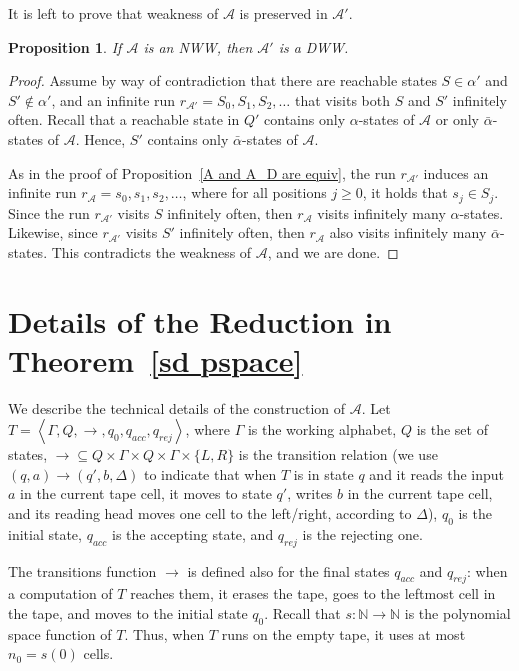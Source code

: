 \documentclass[10pt,a4paper]{amsart}
\newtheorem{prop}[thm]{Proposition}
\theoremstyle{definition}
\numberwithin{equation}{section}
\newcommand{\A}{{\mathcal A}}
\newcommand{\zug}[1]{\left\langle #1 \right\rangle}
\begin{document}
It is left to prove that weakness of $\A$ is preserved in $\A'$. 

\begin{prop}\label{NWW to DWW}
	If $\A$ is an NWW, then $\A'$ is a DWW.
\end{prop}

\begin{proof}
	Assume by way of contradiction that there are reachable states $S\in \alpha'$ and $S'\notin \alpha'$, and an infinite run $r_{\A'} = S_0, S_1, S_2, \ldots$ that visits both $S$ and $S'$ infinitely often. 
	Recall that a reachable state in $Q'$ contains only $\alpha$-states of $\A$ or only $\bar{\alpha}$-states of $\A$. Hence, $S'$ contains only $\bar{\alpha}$-states of $\A$. 
	
	As in the proof of Proposition~\ref{A and A_D are equiv}, the run $r_{\A'}$ induces an infinite run $r_\A = s_0, s_1, s_2, \ldots $, where for all positions $j \geq 0$, it holds that $s_j\in S_j$. Since the run $r_{\A'}$ visits $S$ infinitely often, then $r_\A$ visits infinitely many $\alpha$-states. Likewise, since $r_{\A'}$ visits  $S'$ infinitely often, then $r_\A$ also visits infinitely many $\bar{\alpha}$-states. This contradicts the weakness of $\A$, and we are done.
\end{proof}


\section{Details of the Reduction in Theorem~\ref{sd pspace}}
\label{app tm}


We describe the technical details of the construction of $\A$.
Let $T=\zug{\Gamma,Q,\rightarrow,q_0,q_{acc},q_{rej}}$, where $\Gamma$ is the working
alphabet, $Q$ is the set of states, $\rightarrow \subseteq Q \times
\Gamma \times Q \times \Gamma \times \{L,R\}$ is the transition
relation (we use $(q,a) \rightarrow (q',b,\Delta)$ to indicate that
when $T$ is in state $q$ and it reads the input $a$ in the current
tape cell, it moves to state $q'$, writes $b$ in the current tape
cell, and its reading head moves one cell to the left/right, according
to $\Delta$), $q_0$ is the initial state, $q_{acc}$ is the accepting state, and $q_{rej}$ is the rejecting one. 

The transitions function $\rightarrow$ is defined also for the final states $q_{acc}$ and $q_{rej}$: when a computation of $T$ reaches them, it erases the tape, goes to the leftmost cell in the tape, 
and moves to the initial state $q_0$. Recall that $s: \mathbb{N} \rightarrow \mathbb{N}$ is the polynomial space function of $T$. Thus, when $T$ runs on the empty tape, it uses at most $n_0=s(0)$ cells. 
\end{document}
